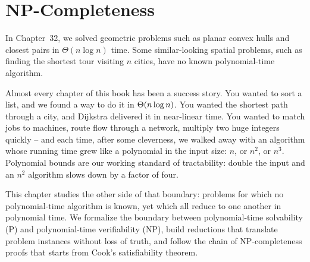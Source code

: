 \chapter{NP-Completeness}
\label{ch33:np}

In Chapter~32, we solved geometric problems such as planar convex hulls and closest pairs in $\Theta(n\log n)$ time. Some similar-looking spatial problems, such as finding the shortest tour visiting $n$ cities, have no known polynomial-time algorithm.

Almost every chapter of this book has been a success story. You wanted to sort a
list, and we found a way to do it in $\Theta(n\log n)$. You wanted the shortest path
through a city, and Dijkstra delivered it in near-linear time. You wanted to
match jobs to machines, route flow through a network, multiply two huge integers
quickly -- and each time, after some cleverness, we walked away with an algorithm
whose running time grew like a polynomial in the input size: $n$, or $n^2$, or
$n^3$. Polynomial bounds are our working standard of tractability: double the
input and an $n^2$ algorithm slows down by a factor of four.

This chapter studies the other side of that boundary: problems for which no
polynomial-time algorithm is known, yet which all reduce to one another in
polynomial time. We formalize the boundary between
polynomial-time solvability ($\mathrm{P}$) and polynomial-time verifiability
($\mathrm{NP}$), build reductions that translate problem instances without loss of
truth, and follow the chain of NP-completeness proofs that starts from Cook's
satisfiability theorem.

